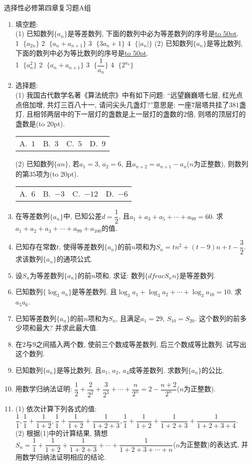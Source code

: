 \documentclass[10pt,a4paper]{article}
\newcommand{\blank}[1]{\underline{\hbox to #1pt{}}}
\newcommand{\bracket}[1]{(\hbox to #1pt{})}
\newcommand{\fourch}[4]{\par\begin{tabular}{p{.23\textwidth}p{.23\textwidth}p{.23\textwidth}p{.23\textwidth}}
A.~#1 &B.~#2& C.~#3& D.~#4
\end{tabular}}
\begin{document}
选择性必修第四章复习题A组

\begin{enumerate}[1.]
\item 填空题:\\
(1) 已知数列$\{a_n\}$是等差数列, 下面的数列中必为等差数列的序号是\blank{50}.\\
\textcircled{1} $\{a_{2n}\}$ \textcircled{2} $\{a_n+a_{n+1}\}$ \textcircled{3} $\{3a_n+1\}$ \textcircled{4} $\{|a_n|\}$
(2) 已知数列$\{a_n\}$是等比数列, 下面的数列中必为等比数列的序号是\blank{50}.\\
\textcircled{1} $\{a_n^2\}$ \textcircled{2} $\{a_n+a_{n+1}\}$ \textcircled{3} $\{\dfrac 1{a_n}\}$ \textcircled{4} $\{2^{a_n}\}$
\item 选择题:\\
(1) 我国古代数学名著《算法统宗》中有如下问题: ``远望巍巍塔七层, 红光点点倍加增, 共灯三百八十一, 请问尖头几盏灯?''意思是: 一座$7$层塔共挂了$381$盏灯, 且相邻两层中的下一层灯的盏数是上一层灯的盏数的$2$倍, 则塔的顶层灯的盏数是\bracket{20}.
\fourch{$1$}{$3$}{$5$}{$9$}
(2) 已知数列$\{an\}$, 若$a_1=3$, $a_2=6$, 且$a_{n+2}=a_{n+1}-a_n$($n$为正整数), 则数列的第$35$项为\bracket{20}.
\fourch{$6$}{$-3$}{$-12$}{$-6$}
\item 在等差数列$\{a_n\}$中, 已知公差$d=\dfrac12$, 且$a_1+a_3+a_5+\cdots+a_{99}=60$. 求$a_1+a_2+a_3+\cdots+a_{99}+a_{100}$的值.
\item 已知存在常数$t$, 使得等差数列$\{a_n\}$的前$n$项和为$S_n=tn^2+(t-9)n+t-\dfrac 32$. 求该数列$\{a_n\}$的通项公式.
\item 设$S_n$为等差数列$\{a_n\}$的前$n$项和, 求证: 数列$\{dfrac{S_n}n\}$是等差数列.
\item 已知数列$\{\log_3a_n\}$是等差数列, 且$\log_3a_1+\log_3a_2+\cdots+\log_3a_{10}=10$. 求$a_5a_6$.
\item 已知等差数列$\{a_n\}$的前$n$项和为$S_n$, 且满足$a_1=29$, $S_{10}=S_{20}$. 这个数列的前多少项和最大? 并求此最大值.
\item 在$2$与$9$之间插入两个数, 使前三个数成等差数列, 后三个数成等比数列. 试写出这个数列.
\item 已知数列$\{a_n\}$是等比数列, 且$a_1$, $a_2$, $a_4$成等差数列. 求数列$\{a_n\}$的公比.
\item 用数学归纳法证明: $\dfrac12+\dfrac2{2^2}+\dfrac3{2^3}+\cdots+\dfrac n{2^n}=2-\dfrac{n+2}{2^n}$($n$为正整数).
\item (1) 依次计算下列各式的值: $\dfrac11,\dfrac11+\dfrac1{1+2},\dfrac11+\dfrac1{1+2}+\dfrac1{1+2+3},\dfrac11+\dfrac1{1+2}+\dfrac1{1+2+3}+\dfrac1{1+2+3+4}$.\\
(2) 根据(1)中的计算结果, 猜想$S_n=\dfrac11+\dfrac1{1+2}+\dfrac1{1+2+3}+\cdots+\dfrac1{1+2+3+\cdots+n}$($n$为正整数)的表达式, 并用数学归纳法证明相应的结论.
\end{enumerate}
\end{document}
